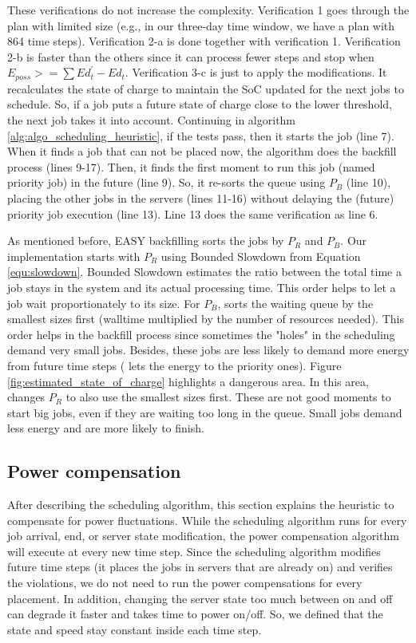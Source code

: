 These verifications do not increase the complexity. Verification 1 goes through the plan with limited size (e.g., in our three-day time window, we have a plan with 864 time steps). Verification 2-a is done together with verification 1. Verification 2-b is faster than the others since it can process fewer steps and stop when $E_{poss} >= \sum Ed_t^{'} - Ed_t$. Verification 3-c is just to apply the modifications. It recalculates the state of charge to maintain the SoC updated for the next jobs to schedule. So, if a job puts a future state of charge close to the lower threshold, the next job takes it into account. Continuing in algorithm \ref{alg:algo_scheduling_heuristic}, if the tests pass, then it starts the job (line 7). When it finds a job that can not be placed now, the algorithm does the backfill process (lines 9-17). Then, it finds the first moment to run this job (named priority job) in the future (line 9). So, it re-sorts the queue using $P_{B}$ (line 10), placing the other jobs in the servers (lines 11-16) without delaying the (future) priority job execution (line 13). Line 13 does the same verification as line 6.

As mentioned before, EASY backfilling sorts the jobs by $P_{R}$ and $P_{B}$. Our implementation starts with $P_{R}$ using Bounded Slowdown from Equation \ref{equ:slowdown}. Bounded Slowdown estimates the ratio between the total time a job stays in the system and its actual processing time. This order helps to let a job wait proportionately to its size. For $P_{B}$, \emph{\systemName} sorts the waiting queue by the smallest sizes first (walltime multiplied by the number of resources needed). This order helps in the backfill process since sometimes the "holes" in the scheduling demand very small jobs. Besides, these jobs are less likely to demand more energy from future time steps (\emph{\systemName} lets the energy to the priority ones). Figure \ref{fig:estimated_state_of_charge} highlights a dangerous area. In this area, \emph{\systemName} changes $P_{R}$ to also use the smallest sizes first. These are not good moments to start big jobs, even if they are waiting too long in the queue. Small jobs demand less energy and are more likely to finish.

\subsection{Power compensation}
\label{sec:model_compensations}

After describing the scheduling algorithm, this section explains the heuristic to compensate for power fluctuations. While the scheduling algorithm runs for every job arrival, end, or server state modification, the power compensation algorithm will execute at every new time step. Since the scheduling algorithm modifies future time steps (it places the jobs in servers that are already on) and verifies the violations, we do not need to run the power compensations for every placement. In addition, changing the server state too much between on and off can degrade it faster and takes time to power on/off. So, we defined that the state and speed stay constant inside each time step. 

